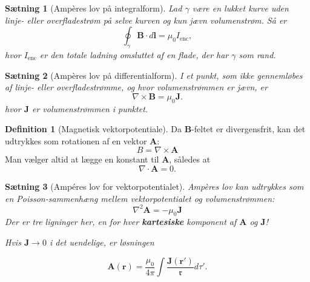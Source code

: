 \documentclass[]{article}
\newcommand{\fr}{\mathfrak{r}}
\newtheorem{theorem}{Sætning}
\theoremstyle{definition}
\newtheorem{definition}{Definition}
\newcommand{\Ienc}{I_\text{enc}}
\begin{document}
\begin{theorem}[Ampères lov på integralform]
	Lad $\gamma$ være en lukket kurve uden linje- eller overfladestrøm på selve kurven og kun jævn volumenstrøm. Så er
	\begin{equation*}
		\oint_\gamma \mathbf{B} \cdot d \mathbf{l} = \mu_0 \Ienc, 
	\end{equation*}
	hvor $\Ienc$ er den totale ladning omsluttet af en flade, der har $\gamma$ som rand.
\end{theorem}

\begin{theorem}[Ampères lov på differentialform]
	I et punkt, som ikke gennemløbes af linje- eller overfladestrømme, og hvor volumenstrømmen er jævn, er 
	\begin{equation*}
		\nabla \times \mathbf{B} = \mu_0 \mathbf{J}.
	\end{equation*}
	hvor $\mathbf{J}$ er volumenstrømmen i punktet.
\end{theorem}

\begin{definition}[Magnetisk vektorpotentiale]
	Da $\mathbf{B}$-feltet er divergensfrit, kan det udtrykkes som rotationen af en vektor $\mathbf{A}$:
	\begin{equation*}
		B = \nabla \times \mathbf{A}
	\end{equation*}
	Man vælger altid at lægge en konstant til $\mathbf{A}$, således at
	\begin{equation*}
		\nabla \cdot \mathbf{A} = 0.
	\end{equation*}
\end{definition}

\begin{theorem}[Ampéres lov for vektorpotentialet]
	Ampères lov kan udtrykkes som en Poisson-sammenhæng mellem vektorpotentialet og volumenstrømmen:
	\begin{equation*}
		\nabla^2 \mathbf{A} = - \mu_0 \mathbf{J}
	\end{equation*}
	Der er tre ligninger her, en for hver \textbf{kartesiske} komponent af $\mathbf{A}$ og $\mathbf{J}$!
	
	Hvis $ \mathbf{J} \rightarrow 0 $ i det uendelige, er løsningen 
	
	\begin{equation*}
		\mathbf{A}(\mathbf{r}) = \frac{\mu_0}{4 \pi } \int \dfrac{\mathbf{J}(\mathbf{r'})}{\fr} d \tau'.
	\end{equation*}
\end{theorem}
\end{document}
